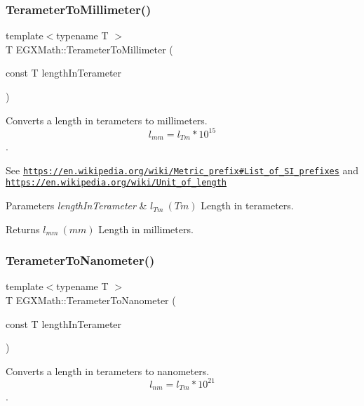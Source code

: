 \subsubsection{\texorpdfstring{Terameter\+To\+Millimeter()}{TerameterToMillimeter()}}
{\footnotesize\ttfamily template$<$typename T $>$ \\
T E\+G\+X\+Math\+::\+Terameter\+To\+Millimeter (\begin{DoxyParamCaption}\item[{const T}]{length\+In\+Terameter }\end{DoxyParamCaption})}



Converts a length in terameters to millimeters. \[ l_{mm}=l_{Tm} * 10^{15} \]. 

See \href{https://en.wikipedia.org/wiki/Metric_prefix#List_of_SI_prefixes}{\tt https\+://en.\+wikipedia.\+org/wiki/\+Metric\+\_\+prefix\#\+List\+\_\+of\+\_\+\+S\+I\+\_\+prefixes} and \href{https://en.wikipedia.org/wiki/Unit_of_length}{\tt https\+://en.\+wikipedia.\+org/wiki/\+Unit\+\_\+of\+\_\+length} 
\begin{DoxyParams}{Parameters}
{\em length\+In\+Terameter} & $ l_{Tm}\ (Tm)$ Length in terameters. \\
\hline
\end{DoxyParams}
\begin{DoxyReturn}{Returns}
$ l_{mm}\ (mm)$ Length in millimeters. 
\end{DoxyReturn}
\mbox{\label{group___e_g_x_math-_conversions-_length_conversions-_terameter-_s_i_ga01da3f80c1d7cf73956140fa84ad615c}} 
\subsubsection{\texorpdfstring{Terameter\+To\+Nanometer()}{TerameterToNanometer()}}
{\footnotesize\ttfamily template$<$typename T $>$ \\
T E\+G\+X\+Math\+::\+Terameter\+To\+Nanometer (\begin{DoxyParamCaption}\item[{const T}]{length\+In\+Terameter }\end{DoxyParamCaption})}



Converts a length in terameters to nanometers. \[ l_{nm}=l_{Tm} * 10^{21} \]. 

